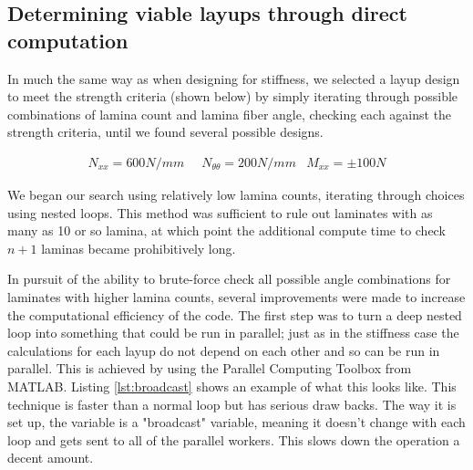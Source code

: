 \documentclass[12pt]{article}
\begin{document}
\subsection{Determining viable layups through direct computation}

In much the same way as when designing for stiffness, we selected a layup design to meet the strength criteria (shown below) by simply iterating through possible combinations of lamina count and lamina fiber angle, checking each against the strength criteria, until we found several possible designs.


\begin{equation}
  \begin{aligned}
    N_{xx} = 600 N/mm &   \;\; N_{\theta \theta} = 200 N/mm & M_{xx} = \pm 100 N
    \label{eq:strength}
  \end{aligned}
\end{equation}

We began our search using relatively low lamina counts, iterating through choices using nested  loops. This method was sufficient to rule out laminates with as many as 10 or so lamina, at which point the additional compute time to check $n+1$ laminas became prohibitively long.

In pursuit of the ability to brute-force check all possible angle combinations for laminates with higher lamina counts, several improvements were made to increase the computational efficiency of the code. The first step was to turn a deep nested  loop into something that could be run in parallel; just as in the stiffness case the calculations for each layup do not depend on each other and so can be run in parallel. This is achieved by using the Parallel Computing Toolbox from MATLAB. Listing \ref{lst:broadcast} shows an example of what this looks like. This technique is faster than a normal  loop but has serious draw backs. The way it is set up, the  variable is a "broadcast" variable, meaning it doesn't change with each loop and gets sent to all of the parallel workers. This slows down the operation a decent amount.
\end{document}
